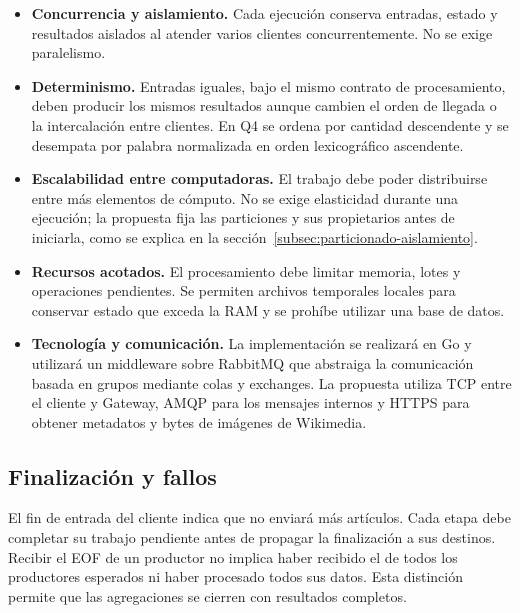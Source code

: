 \begin{itemize}
    \item \textbf{Concurrencia y aislamiento.} Cada ejecución conserva entradas,
    estado y resultados aislados al atender varios clientes concurrentemente.
    No se exige paralelismo.

    \item \textbf{Determinismo.} Entradas iguales, bajo el mismo contrato de
    procesamiento, deben producir los mismos resultados aunque cambien el
    orden de llegada o la intercalación entre clientes. En Q4 se ordena por
    cantidad descendente y se desempata por palabra normalizada en orden
    lexicográfico ascendente.

    \item \textbf{Escalabilidad entre computadoras.} El trabajo debe poder
    distribuirse entre más elementos de cómputo. No se exige elasticidad durante
    una ejecución; la propuesta fija las particiones y sus propietarios antes
    de iniciarla, como se explica en la
    sección~\ref{subsec:particionado-aislamiento}.

    \item \textbf{Recursos acotados.} El procesamiento debe limitar memoria,
    lotes y operaciones pendientes. Se permiten archivos temporales locales
    para conservar estado que exceda la RAM y se prohíbe utilizar una base de
    datos.

    \item \textbf{Tecnología y comunicación.} La implementación se realizará
    en Go y utilizará un middleware sobre RabbitMQ que abstraiga la comunicación
    basada en grupos mediante colas y exchanges. La propuesta utiliza TCP entre
    el cliente y Gateway, AMQP para los mensajes internos y HTTPS para obtener
    metadatos y bytes de imágenes de Wikimedia.
\end{itemize}

\subsection{Finalización y fallos}

El fin de entrada del cliente indica que no enviará más artículos. Cada etapa
debe completar su trabajo pendiente antes de propagar la finalización a sus
destinos. Recibir el EOF de un productor no implica haber recibido el de todos
los productores esperados ni haber procesado todos sus datos. Esta distinción
permite que las agregaciones se cierren con resultados completos.

